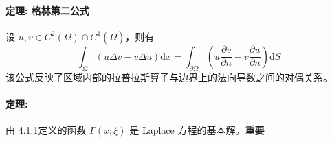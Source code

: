 \documentclass[12pt,a4paper]{ctexart}
\begin{document}
	\paragraph{定理: 格林第二公式}
	设 $u, v \in C^2(\Omega) \cap C^1(\bar{\Omega})$，则有
	\begin{equation}
		\int_{\Omega} (u \Delta v - v \Delta u) \mathrm{d}x = \int_{\partial \Omega} \left( u \frac{\partial v}{\partial n} - v \frac{\partial u}{\partial n} \right) \mathrm{d}S
	\end{equation}
	该公式反映了区域内部的拉普拉斯算子与边界上的法向导数之间的对偶关系。
	
	\paragraph{定理:}由 4.1.1定义的函数 $\Gamma(x;\xi)$ 是 Laplace 方程的基本解。\textbf{重要}
	
\end{document}
